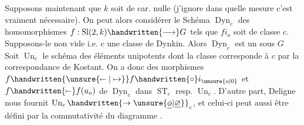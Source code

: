Supposons maintenant que $k$ soit de car. nulle (j'ignore dans quelle mesure c'est vraiment nécessaire). On peut alors considérer le Schéma $\operatorname{Dyn}_c$ des homomorphismes $f:\operatorname{Sl}(2,k)\handwritten{\longrightarrow}G$ tels que $fi_o$ soit de classe $c$. Supposons-le non vide i.e. $c$ une classe de Dynkin. Alors $\operatorname{Dyn}_c$ est un  sous $G$ Soit $\operatorname{Un}_c$ le schéma des éléments unipotents dont la classe corresponde à  $c$ par la correspondance
de Kostant. On a donc des morphismes $f\handwritten{\unsure{\mathrel{\mapstochar\relbar}|\mapsto}}f\handwritten{\circ}i_{\unsure{o|0}}$ et $f\handwritten{\mathrel{\mapstochar\relbar}}f(u_o)$ de $\operatorname{Dyn}_c$ dans $\operatorname{ST}_c$ resp. $\operatorname{Un}_c$. D'autre part, Deligne nous fournit $\operatorname{Un}_c\handwritten{\to\unsure{\underline{\phi}|\underline{\varnothing}}}_c$, et celui-ci peut aussi être défini par la commutativité du diagramme 
.

